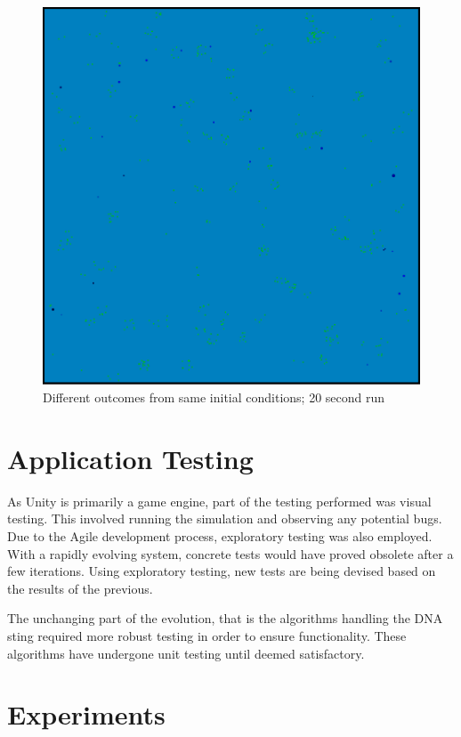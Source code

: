 \begin{figure}[!th]
\begin{minipage}[b]{0.5\textwidth}
		\includegraphics[scale=0.37]{images/test2}
	\end{minipage}
	\caption{\label{fig:randomoutcome}Different outcomes from same initial conditions; 20 second run}
\end{figure}

\section{Application Testing}
As Unity is primarily a game engine, part of the testing performed was visual testing. This involved running the simulation and observing any potential bugs. Due to the Agile development process, exploratory testing was also employed. With a rapidly evolving system, concrete tests would have proved obsolete after a few iterations. Using exploratory testing, new tests are being devised based on the results of the previous.

The unchanging part of the evolution, that is the algorithms handling the DNA sting required more robust testing in order to ensure functionality. These algorithms have undergone unit testing until deemed satisfactory.

\section{Experiments} \label{experiments}

